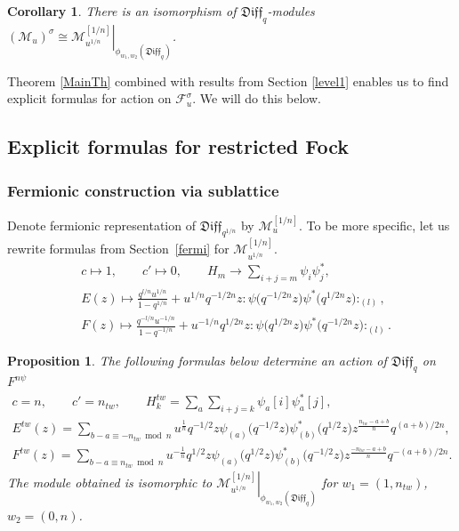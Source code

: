\documentclass[pdftex]{sigma}
\numberwithin{equation}{section}
\newtheorem{Proposition}[Theorem]{Proposition}
\newtheorem{Corollary}[Theorem]{Corollary}
\theoremstyle{definition}
\newcommand{\qd}[1]{ \mathfrak{Diff}_{q^{#1}} }
\newcommand{\qD}{\mathfrak{Diff}_q}
\newcommand{\psia}{\psi_{({a})}}
\newcommand{\psib}{\psi^*_{( b )}}
\begin{document}
\begin{Corollary}There is an isomorphism of $\qD$-modules $\left. ( \mathcal{M}_{u} )^{ \sigma } \cong \mathcal{M}^{[1/n]}_{u^{1/n}} \right|_{\phi_{w_1,w_2} (\qD ) }$.
\end{Corollary}

Theorem \ref{MainTh} combined with results from Section \ref{level1} enables us to find explicit formulas for action on $\mathcal{F}_{u}^{ \sigma }$. We will do this below.

\subsection{Explicit formulas for restricted Fock}
\subsubsection{Fermionic construction via sublattice}
Denote fermionic representation of $\qd{1/n}$ by $\mathcal{M}^{[1/n]}_u$. To be more specific, let us rewrite formulas from Section~\ref{fermi} for $\mathcal{M}^{[1/n]}_{u^{1/n}}$.
\begin{align}
&c \mapsto 1, \qquad c' \mapsto 0, \qquad H_m \rightarrow \sum_{i+j=m} \psi_i \psi_j^*, \nonumber\\
&E(z) \mapsto \frac{q^{l/n} u^{1/n} }{1-q^{1/n}} + u^{1/n} q^{ - 1/2n }z : \! \psi\big( q^{-1/2n} z\big) \psi^* \big( q^{1/2n} z\big) \! :_{(l)} ,
\label{ferm:En} \\
&F(z) \mapsto \frac{q^{-l/n} u^{-1/n} }{1-q^{-1/n}} + u^{-1/n} q^{1/2n} z : \! \psi\big( q^{1/2n} z\big) \psi^* \big(q^{-1/2n} z\big)\!:_{(l)}.
\label{ferm:Fn}
\end{align}
\begin{Proposition} \label{TheFermionicProp}
The following formulas below determine an action of $\qD$ on $F^{n\psi}$
\begin{gather}
c=n, \qquad c' = n_{tw}, \qquad
H^{tw}_k = \sum_{a} \sum_{i+j=k} \psi_a [i] \psi^*_a [j] , \label{eq1: TheFermionicProp} \\
E^{tw}(z) = \sum_{b-a \equiv -n_{tw} \bmod n} u^{\frac{1}{n}} q^{-1/2} z \psia \big( q^{-1/2} z\big) \psib \big(q^{1/2} z\big) z^{\frac{n_{tw}-a+b}{n}} q^{(a+b)/2n}, \label{prop:EtwFermi} \\
F^{tw}(z) = \sum_{b-a \equiv n_{tw} \bmod n} u^{-\frac{1}{n}} q^{1/2} z \psia \big( q^{1/2} z\big) \psib \big(q^{-1/2} z\big) z^{\frac{-n_{tw}-a+b}{n}} q^{-(a+b)/2n}. \label{prop:FtwFermi}
\end{gather}
The module obtained is isomorphic to $\left. \mathcal{M}^{[1/n]}_{u^{1/n}} \right|_{\phi_{w_1, w_2}(\qD)}$ for $w_1=(1, n_{tw})$, $w_2=(0,n)$.
\end{Proposition}
\end{document}
